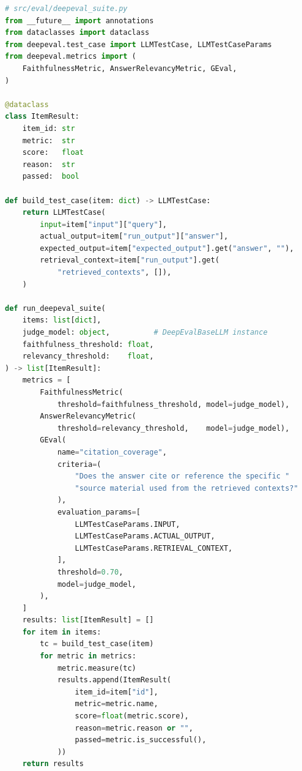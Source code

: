 \begin{lstlisting}[language=Python, caption={DeepEval suite: per-item
    scoring with built-in and rubric-based metrics},
    label={lst:deepeval-suite}]
# src/eval/deepeval_suite.py
from __future__ import annotations
from dataclasses import dataclass
from deepeval.test_case import LLMTestCase, LLMTestCaseParams
from deepeval.metrics import (
    FaithfulnessMetric, AnswerRelevancyMetric, GEval,
)

@dataclass
class ItemResult:
    item_id: str
    metric:  str
    score:   float
    reason:  str
    passed:  bool

def build_test_case(item: dict) -> LLMTestCase:
    return LLMTestCase(
        input=item["input"]["query"],
        actual_output=item["run_output"]["answer"],
        expected_output=item["expected_output"].get("answer", ""),
        retrieval_context=item["run_output"].get(
            "retrieved_contexts", []),
    )

def run_deepeval_suite(
    items: list[dict],
    judge_model: object,          # DeepEvalBaseLLM instance
    faithfulness_threshold: float,
    relevancy_threshold:    float,
) -> list[ItemResult]:
    metrics = [
        FaithfulnessMetric(
            threshold=faithfulness_threshold, model=judge_model),
        AnswerRelevancyMetric(
            threshold=relevancy_threshold,    model=judge_model),
        GEval(
            name="citation_coverage",
            criteria=(
                "Does the answer cite or reference the specific "
                "source material used from the retrieved contexts?"
            ),
            evaluation_params=[
                LLMTestCaseParams.INPUT,
                LLMTestCaseParams.ACTUAL_OUTPUT,
                LLMTestCaseParams.RETRIEVAL_CONTEXT,
            ],
            threshold=0.70,
            model=judge_model,
        ),
    ]
    results: list[ItemResult] = []
    for item in items:
        tc = build_test_case(item)
        for metric in metrics:
            metric.measure(tc)
            results.append(ItemResult(
                item_id=item["id"],
                metric=metric.name,
                score=float(metric.score),
                reason=metric.reason or "",
                passed=metric.is_successful(),
            ))
    return results
\end{lstlisting}

